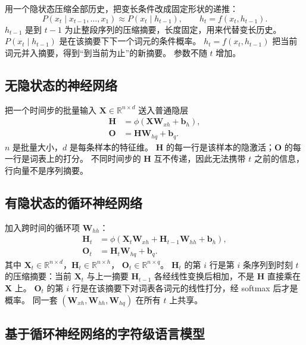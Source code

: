 

用一个隐状态压缩全部历史，把变长条件改成固定形状的递推：
\[
P(x_t \mid x_{t-1},\ldots,x_1)\approx P(x_t \mid h_{t-1}),
\qquad
h_t=f(x_t,h_{t-1}).
\]
$h_{t-1}$ 是到 $t-1$ 为止整段序列的压缩摘要，长度固定，用来代替变长历史。
$P(x_t\mid h_{t-1})$ 是在该摘要下下一个词元的条件概率。
$h_t=f(x_t,h_{t-1})$ 把当前词元并入摘要，得到“到当前为止”的新摘要。
参数不随 $t$ 增加。

\subsection{无隐状态的神经网络}

把一个时间步的批量输入 $\bm{X}\in\mathbb{R}^{n\times d}$ 送入普通隐层
\begin{align*}
\bm{H}&=\phi(\bm{X}\bm{W}_{xh}+\bm{b}_h),
\\
\bm{O}&=\bm{H}\bm{W}_{hq}+\bm{b}_q.
\end{align*}
$n$ 是批量大小，$d$ 是每条样本的特征维。
$\bm{H}$ 的每一行是该样本的隐激活；$\bm{O}$ 的每一行是词表上的打分。
不同时间步的 $\bm{H}$ 互不传递，因此无法携带 $t$ 之前的信息，行向量不是序列摘要。

\subsection{有隐状态的循环神经网络}

加入跨时间的循环项 $\bm{W}_{hh}$：
\begin{align*}
\bm{H}_t
&=
\phi(\bm{X}_t\bm{W}_{xh}+\bm{H}_{t-1}\bm{W}_{hh}+\bm{b}_h),
\\
\bm{O}_t
&=
\bm{H}_t\bm{W}_{hq}+\bm{b}_q.
\end{align*}
其中 $\bm{X}_t\in\mathbb{R}^{n\times d}$，$\bm{H}_t\in\mathbb{R}^{n\times h}$，
$\bm{O}_t\in\mathbb{R}^{n\times q}$。
$\bm{H}_t$ 的第 $i$ 行是第 $i$ 条序列到时刻 $t$ 的压缩摘要：当前 $\bm{X}_t$ 与上一摘要 $\bm{H}_{t-1}$ 各经线性变换后相加，不是 $\bm{H}$ 直接乘在 $\bm{X}$ 上。
$\bm{O}_t$ 的第 $i$ 行是在该摘要下对词表各词元的线性打分，经 softmax 后才是概率。
同一套 $(\bm{W}_{xh},\bm{W}_{hh},\bm{W}_{hq})$ 在所有 $t$ 上共享。

\subsection{基于循环神经网络的字符级语言模型}

